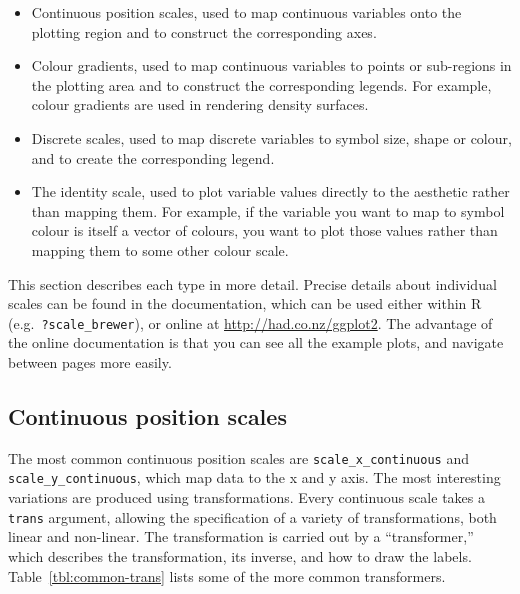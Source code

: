 \begin{itemize}
  \item Continuous position scales, used to map continuous variables onto the plotting region and to construct the corresponding axes.

  \item Colour gradients, used to map continuous variables to points or sub-regions in the plotting area and to construct the corresponding legends.  For example, colour gradients are used in rendering density surfaces.

  \item Discrete scales, used to map discrete variables to symbol size, shape or colour, and to create the corresponding legend.

  \item The identity scale, used to plot variable values directly to the aesthetic rather than mapping them.  For example, if the variable you want to map to symbol colour is itself a vector of colours, you want to plot those values rather than mapping them to some other colour scale.

\end{itemize}

\noindent  This section describes each type in more detail.  Precise details about individual scales can be found in the documentation, which can be used either within R (e.g.\ {\tt ?scale\_brewer}), or online at  \url{http://had.co.nz/ggplot2}.  The advantage of the online documentation is that you can see all the example plots, and navigate between pages more easily.

\subsection{Continuous position scales}
\label{sub:scale-position}

The most common continuous position scales are {\tt scale\_x\_continuous} and {\tt scale\_y\_continuous}, which map data to the x and y axis.  The most interesting variations are produced using transformations.  Every continuous scale takes a {\tt trans} argument, allowing the specification of a variety of transformations, both linear and non-linear.  The transformation is carried out by a ``transformer,'' which describes the transformation, its inverse, and how to draw the labels. Table~\ref{tbl:common-trans} lists some of the more common transformers.

